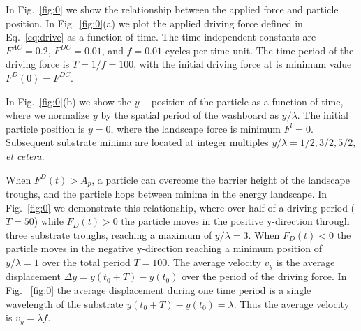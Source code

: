 \documentclass[twocolumn,preprintnumbers,amsmath,amssymb,aps,prx]{revtex4}
\begin{document}

In Fig.~\ref{fig:0} we
show the relationship between the applied force and particle
position.
In Fig.~\ref{fig:0}(a)
we plot the applied driving force defined in Eq.~\ref{eq:drive}
as a function of time.
The time independent constants are 
$F^{AC}=0.2$, $F^{DC}=0.01$, and $f=0.01$ cycles per time unit.
The time period of the driving force is
$T = 1/f = 100$,
with the initial driving force at is minimum value 
$F^D(0) = F^{DC}$. 

In Fig.~\ref{fig:0}(b) 
we show the $y-$position of the particle
as a function of time,
where we 
normalize $y$ by the spatial period of the washboard as
$y/\lambda$.
The initial particle position is $y=0$,
where the landscape force is minimum $F^l = 0$.
Subsequent substrate 
minima are located at integer multiples $y/\lambda = 1/2, 3/2, 5/2, $ {\it et cetera}.

When $F^D(t) > A_p$, a particle can 
overcome the barrier height of the landscape troughs,
and 
the particle hops between minima in the energy landscape.
In Fig.~\ref{fig:0} we demonstrate this relationship,
where over half of a driving period ($T = 50$) %
while $F_{D}(t) > 0 $ 
the particle moves
in the positive y-direction
through three
substrate troughs, reaching a maximum of $y/\lambda = 3$.
When $F_{D}(t) < 0 $
the particle moves in the negative y-direction
reaching a minimum position
of $y/\lambda = 1$
over the total period $T = 100$.
The average velocity $\bar{v}_y$
is the average displacement $\Delta y = y(t_0+T) - y(t_0)$
over the period of the driving force.
In Fig. ~\ref{fig:0}
the average displacement during one time period is a single wavelength
of the substrate $y(t_0+T) - y(t_0) = \lambda$.
Thus the average velocity 
is $\bar{v}_y = \lambda f$. %
\end{document}
